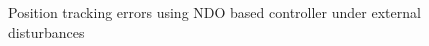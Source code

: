 \documentclass[letterpaper%
, twoside%
, 12pt%
,memoire%
, english%
,creativecommons,hyperref%
]{thETS}
\theoremstyle{newThmStyle}
\begin{document}
\begin{figure}[H]
	\centering
	\parbox{0.75\textwidth}{\caption{Position tracking errors using NDO based controller under external disturbances\label{Fig:xyzerrNDODist}}}
\end{figure}
\end{document}
